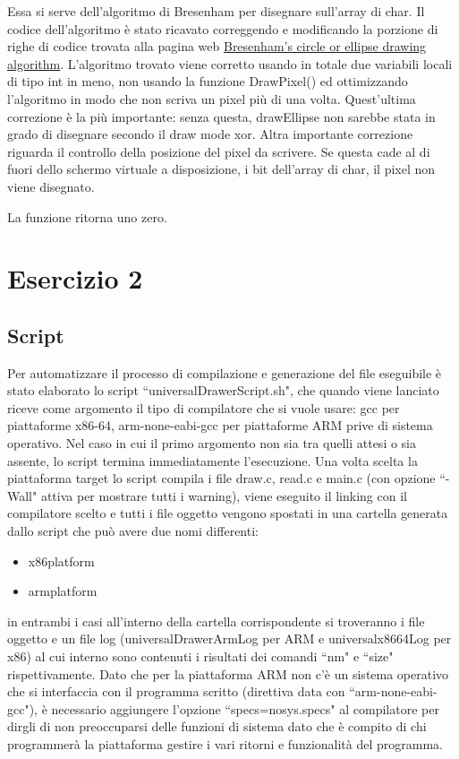 \documentclass[a4paper]{article}
\begin{document}
		Essa si serve dell'algoritmo di Bresenham per disegnare sull'array di char.
                Il codice dell'algoritmo è stato ricavato correggendo e modificando la porzione di righe di codice trovata alla pagina web
                \href{https://sites.google.com/site/ruslancray/lab/projects/bresenhamscircleellipsedrawingalgorithm/bresenham-s-circle-ellipse-drawing-algorithm}{Bresenham's circle or ellipse drawing algorithm}.
                L'algoritmo trovato viene corretto usando in totale due variabili locali di tipo int in meno, non usando la funzione DrawPixel()
                ed ottimizzando l'algoritmo in modo che non scriva un pixel più di una volta. Quest'ultima correzione è la più importante:
                senza questa, drawEllipse non sarebbe stata in grado di disegnare secondo il draw mode xor.
                Altra importante correzione riguarda il controllo della posizione del pixel da scrivere.
                Se questa cade al di fuori dello schermo virtuale a disposizione, i bit dell'array di char, il pixel non viene disegnato.
		
		La funzione ritorna uno zero.

\section{Esercizio 2}
	\subsection{Script}
	Per automatizzare il processo di compilazione e generazione del file eseguibile è stato elaborato lo script ``universalDrawerScript.sh", che quando viene lanciato riceve come argomento il tipo di compilatore che si vuole usare: gcc per piattaforme x86-64, arm-none-eabi-gcc per piattaforme ARM prive di sistema operativo. Nel caso in cui il primo argomento non sia tra quelli attesi o sia assente, lo script termina immediatamente l'esecuzione.
	\newline
	Una volta scelta la piattaforma target lo script compila i file draw.c, read.c e main.c (con opzione ``-Wall" attiva per mostrare tutti i warning), viene eseguito il linking con il compilatore scelto e tutti i file oggetto vengono spostati in una cartella generata dallo script che può avere due nomi differenti:
	\begin{itemize}
		\item x86\textunderscore platform 
		\item arm\textunderscore platform 
	\end{itemize}
in entrambi i casi all'interno della cartella corrispondente si troveranno i file oggetto e un file log (universalDrawerArmLog per ARM e universalx86\textunderscore 64Log per x86) al cui interno sono contenuti i risultati dei comandi ``nm" e ``size" rispettivamente.
\newline
Dato che per la piattaforma ARM non c'è un sistema operativo che si interfaccia con il programma scritto  (direttiva data con ``arm-none-eabi-gcc"), è necessario aggiungere l'opzione ``specs=nosys.specs" al compilatore per dirgli di non preoccuparsi delle funzioni di sistema dato che è compito di chi programmerà la piattaforma gestire i vari ritorni e funzionalità del programma.
\end{document}
